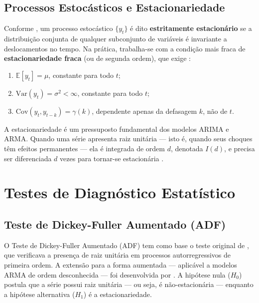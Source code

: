 \documentclass[
  12pt,
  openright,
  twoside,
  a4paper,
  english,
  brazil
]{abntex2}
\begin{document}
\subsection{Processos Estocásticos e Estacionariedade}
\label{subsec:estacionariedade}

Conforme , um processo estocástico $\{y_t\}$ é dito \textbf{estritamente estacionário} se a distribuição conjunta de qualquer subconjunto de variáveis é invariante a deslocamentos no tempo. Na prática, trabalha-se com a condição mais fraca de \textbf{estacionariedade fraca} (ou de segunda ordem), que exige \cite{hamilton1994time}:

\begin{enumerate}
  \item $\mathbb{E}[y_t] = \mu$, constante para todo $t$;
  \item $\text{Var}(y_t) = \sigma^2 < \infty$, constante para todo $t$;
  \item $\text{Cov}(y_t, y_{t-k}) = \gamma(k)$, dependente apenas da defasagem $k$, não de $t$.
\end{enumerate}

A estacionariedade é um pressuposto fundamental dos modelos ARIMA e ARMA. Quando uma série apresenta raiz unitária — isto é, quando seus choques têm efeitos permanentes — ela é integrada de ordem $d$, denotada $I(d)$, e precisa ser diferenciada $d$ vezes para tornar-se estacionária \cite{hamilton1994time}.

\section{Testes de Diagnóstico Estatístico}
\label{sec:testes-diagnostico}

\subsection{Teste de Dickey-Fuller Aumentado (ADF)}
\label{subsec:adf}

O Teste de Dickey-Fuller Aumentado (ADF) tem como base o teste original de , que verificava a presença de raiz unitária em processos autorregressivos de primeira ordem. A extensão para a forma aumentada — aplicável a modelos ARMA de ordem desconhecida — foi desenvolvida por . A hipótese nula ($H_0$) postula que a série possui raiz unitária — ou seja, é não-estacionária — enquanto a hipótese alternativa ($H_1$) é a estacionariedade.
\end{document}
